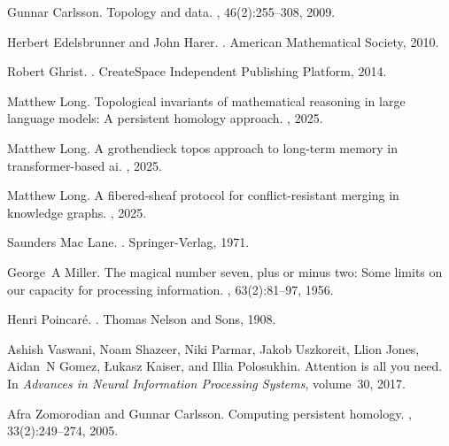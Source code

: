 \documentclass[11pt]{article}
\begin{document}

\begin{thebibliography}{10}

Gunnar Carlsson.
\newblock Topology and data.
, 46(2):255--308, 2009.

Herbert Edelsbrunner and John Harer.
.
\newblock American Mathematical Society, 2010.

Robert Ghrist.
.
\newblock CreateSpace Independent Publishing Platform, 2014.

Matthew Long.
\newblock Topological invariants of mathematical reasoning in large language models: A persistent homology approach.
, 2025.

Matthew Long.
\newblock A grothendieck topos approach to long-term memory in transformer-based ai.
, 2025.

Matthew Long.
\newblock A fibered-sheaf protocol for conflict-resistant merging in knowledge graphs.
, 2025.

Saunders Mac Lane.
.
\newblock Springer-Verlag, 1971.

George~A Miller.
\newblock The magical number seven, plus or minus two: Some limits on our capacity for processing information.
, 63(2):81--97, 1956.

Henri Poincaré.
.
\newblock Thomas Nelson and Sons, 1908.

Ashish Vaswani, Noam Shazeer, Niki Parmar, Jakob Uszkoreit, Llion Jones, Aidan~N Gomez, Łukasz Kaiser, and Illia Polosukhin.
\newblock Attention is all you need.
\newblock In {\em Advances in Neural Information Processing Systems}, volume~30, 2017.

Afra Zomorodian and Gunnar Carlsson.
\newblock Computing persistent homology.
, 33(2):249--274, 2005.

\end{thebibliography}
\end{document}
